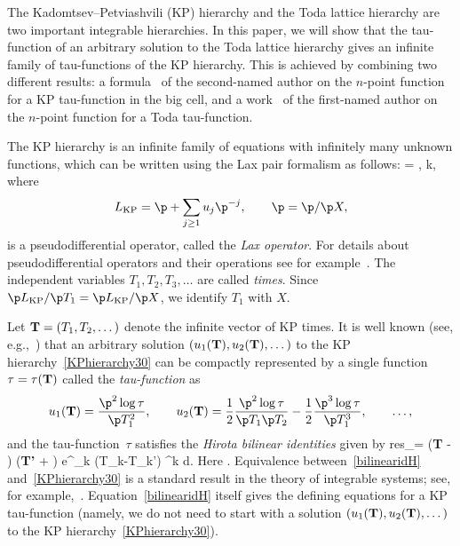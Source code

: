 The Kadomtsev--Petviashvili (KP) hierarchy and
the Toda lattice hierarchy are two important integrable hierarchies. In this
paper, we will show that the tau-function of an arbitrary solution to the Toda lattice hierarchy
gives an infinite family of tau-functions of the KP hierarchy.
This is achieved by combining two different results:
a formula~\cite{Zhou-Emergent} of the second-named author on the $n$-point function for a KP tau-function in the big cell,
and a work~\cite{Y} of the first-named author on the $n$-point function for a Toda tau-function.

The KP hierarchy is an infinite family of equations with infinitely many unknown functions,
which can be written using the Lax pair formalism as follows:
\beq\label{KPhierarchy30}
 = , \qquad k,
\eeq
where
\[
L_{\rm KP} = \p + \sum_{j\ge1} u_j \p^{-j}, \qquad \p=\p/\p X,
\]
is a pseudodifferential operator, called the {\it Lax operator}.
For details about pseudodifferential operators and their operations see for example~\cite{Dickey}.
The independent variables $T_1,T_2,T_3,\dots$ are called {\it times}.
Since $\p L_{\rm KP}/\p T_1 = \p L_{\rm KP}/\p X$, we identify $T_1$ with $X$.

Let ${\bf T}=(T_1,T_2,\dots)$ denote the infinite vector of KP times.
It is well known (see, e.g.,~\cite{Dickey}) that an arbitrary solution $(u_1({\bf T}), u_2({\bf T}),\dots)$
to the KP hierarchy~\eqref{KPhierarchy30} can be compactly represented by a single function $\tau=\tau({\bf T})$
called the {\it tau-function} as
\[
u_1({\bf T}) = \frac{\p^2 \log \tau}{\p T_1^2}, \qquad u_2({\bf T}) = \frac12 \frac{\p^2 \log \tau}{\p T_1 \p T_2} - \frac12 \frac{\p^3 \log \tau}{\p T_1^3}, \qquad \dots,
\]
and the tau-function~$\tau$ satisfies the {\it Hirota bilinear identities} given by
\beq\label{bilinearidH}
{\rm res}_{\lambda=\infty} \tau\bigl({\bf T} - \bigr) \tau\bigl({\bf T'} + \bigr) {\rm e}^{\sum_{k} (T_k-T_k') \lambda^k} {\rm d}.
\eeq
Here .
Equivalence between~\eqref{bilinearidH} and~\eqref{KPhierarchy30} is a standard result in the theory of integrable systems; see, for example,~\cite{Dickey}.
Equation~\eqref{bilinearidH} itself gives the defining equations for a KP tau-function (namely, we do not
 need to start with a solution $(u_1({\bf T}), u_2({\bf T}),\dots)$ to the KP hierarchy~\eqref{KPhierarchy30}).

